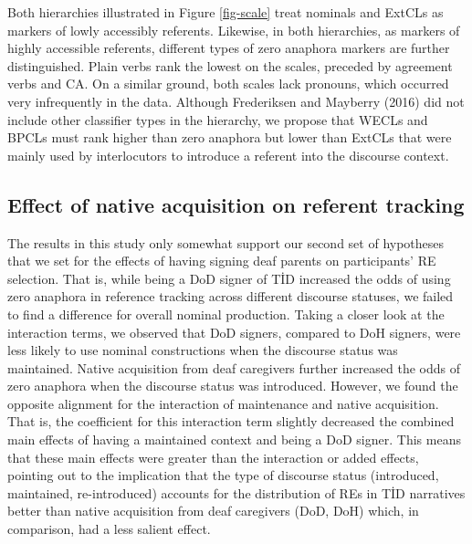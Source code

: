 \documentclass[]{elsarticle} %
\begin{document}
Both hierarchies illustrated in Figure \ref{fig-scale} treat nominals
and ExtCLs as markers of lowly accessibly referents. Likewise, in both
hierarchies, as markers of highly accessible referents, different types
of zero anaphora markers are further distinguished. Plain verbs rank the
lowest on the scales, preceded by agreement verbs and CA. On a similar
ground, both scales lack pronouns, which occurred very infrequently in
the data. Although Frederiksen and Mayberry (2016) did not include other
classifier types in the hierarchy, we propose that WECLs and BPCLs must
rank higher than zero anaphora but lower than ExtCLs that were mainly
used by interlocutors to introduce a referent into the discourse
context.

\hypertarget{effect-of-native-acquisition-on-referent-tracking}{%
\subsection{Effect of native acquisition on referent
tracking}\label{effect-of-native-acquisition-on-referent-tracking}}

The results in this study only somewhat support our second set of
hypotheses that we set for the effects of having signing deaf parents on
participants' RE selection. That is, while being a DoD signer of TİD
increased the odds of using zero anaphora in reference tracking across
different discourse statuses, we failed to find a difference for overall
nominal production. Taking a closer look at the interaction terms, we
observed that DoD signers, compared to DoH signers, were less likely to
use nominal constructions when the discourse status was maintained.
Native acquisition from deaf caregivers further increased the odds of
zero anaphora when the discourse status was introduced. However, we
found the opposite alignment for the interaction of maintenance and
native acquisition. That is, the coefficient for this interaction term
slightly decreased the combined main effects of having a maintained
context and being a DoD signer. This means that these main effects were
greater than the interaction or added effects, pointing out to the
implication that the type of discourse status (introduced, maintained,
re-introduced) accounts for the distribution of REs in TİD narratives
better than native acquisition from deaf caregivers (DoD, DoH) which, in
comparison, had a less salient effect.
\end{document}
